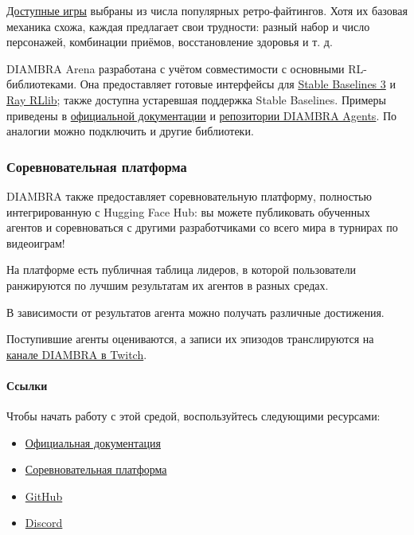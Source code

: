 \documentclass[11pt,a4paper]{article}
\begin{document}
\href{https://docs.diambra.ai/envs/games/}{Доступные игры} выбраны из числа популярных ретро-файтингов. Хотя их базовая механика схожа, каждая предлагает свои трудности: разный набор и число персонажей, комбинации приёмов, восстановление здоровья и т. д.

DIAMBRA Arena разработана с учётом совместимости с основными RL-библиотеками. Она предоставляет готовые интерфейсы для \href{https://stable-baselines3.readthedocs.io/en/master/}{Stable Baselines 3} и \href{https://docs.ray.io/en/latest/rllib/index.html}{Ray RLlib}; также доступна устаревшая поддержка Stable Baselines. Примеры приведены в \href{https://docs.diambra.ai/}{официальной документации} и \href{https://github.com/diambra/agents}{репозитории DIAMBRA Agents}. По аналогии можно подключить и другие библиотеки.

\subsubsection{Соревновательная платформа}\label{competition-platform}

DIAMBRA также предоставляет соревновательную платформу, полностью интегрированную с Hugging Face Hub: вы можете публиковать обученных агентов и соревноваться с другими разработчиками со всего мира в турнирах по видеоиграм!

На платформе есть публичная таблица лидеров, в которой пользователи ранжируются по лучшим результатам их агентов в разных средах.

В зависимости от результатов агента можно получать различные достижения.

Поступившие агенты оцениваются, а записи их эпизодов транслируются на \href{https://www.twitch.tv/diambra_ai}{канале DIAMBRA в Twitch}.

\paragraph{Ссылки}\label{references}

Чтобы начать работу с этой средой, воспользуйтесь следующими ресурсами:

\begin{itemize}
\item
  \href{https://docs.diambra.ai/}{Официальная документация}
\item
  \href{https://diambra.ai}{Соревновательная платформа}
\item
  \href{https://github.com/diambra/}{GitHub}
\item
  \href{https://diambra.ai/discord}{Discord}
\end{itemize}
\end{document}
